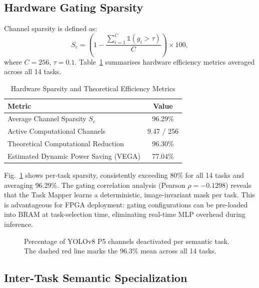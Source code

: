 \documentclass[conference]{IEEEtran}
\begin{document}
\subsection{Hardware Gating Sparsity}

Channel sparsity is defined as:
\begin{equation}
    S_c = \left(1 - \frac{\sum_{i=1}^{C}\mathbb{1}(g_i > \tau)}{C}\right)\times 100,
    \label{eq:sparsity}
\end{equation}
where $C=256$, $\tau=0.1$. Table~\ref{tab:sparsity} summarises hardware
efficiency metrics averaged across all 14 tasks.

\begin{table}[htbp]
\caption{Hardware Sparsity and Theoretical Efficiency Metrics}
\label{tab:sparsity}
\begin{center}
\begin{tabular}{lc}
\toprule
\textbf{Metric} & \textbf{Value} \\
\midrule
Average Channel Sparsity $S_c$ & 96.29\% \\
Active Computational Channels & 9.47 / 256 \\
Theoretical Computational Reduction & 96.30\% \\
Estimated Dynamic Power Saving (VEGA) & 77.04\% \\
\bottomrule
\end{tabular}
\end{center}
\end{table}

Fig.~\ref{fig:sparsity_bar} shows per-task sparsity, consistently exceeding 80\%
for all 14 tasks and averaging 96.29\%. The gating correlation analysis
(Pearson $\rho=-0.1298$) reveals that the Task Mapper learns a deterministic,
image-invariant mask per task. This is advantageous for FPGA deployment: gating
configurations can be pre-loaded into BRAM at task-selection time, eliminating
real-time MLP overhead during inference.

\begin{figure}[htbp]
\centerline{\fbox{\rule{0pt}{3cm}\rule{8cm}{0pt}}}
\caption{Percentage of YOLOv8 P5 channels deactivated per semantic task.
The dashed red line marks the 96.3\% mean across all 14 tasks.}
\label{fig:sparsity_bar}
\end{figure}

\subsection{Inter-Task Semantic Specialization}
\end{document}
